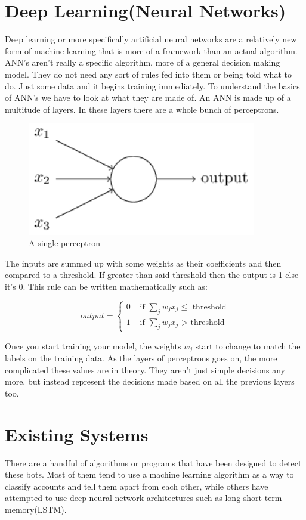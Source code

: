 \section{Deep Learning(Neural Networks)}
Deep learning or more specifically artificial neural networks are a relatively new form of machine learning that is more of a framework than an actual algorithm. ANN's aren't really a specific algorithm, more of a general decision making model. They do not need any sort of rules fed into them or being told what to do. Just some data and it begins training immediately. To understand the basics of ANN's we have to look at what they are made of. An ANN is made up of a multitude of layers. In these layers there are a whole bunch of perceptrons. 
\begin{figure}[!h]
\centering
\includegraphics[width=100mm]{figures/perceptron}
\caption{A single perceptron}
\end{figure}

The inputs are summed up with some weights as their coefficients and then compared to a threshold. If greater than said threshold then the output is 1 else it's 0. This rule can be written mathematically such as: 

$$
output = \begin{cases}
0 & \text{ if $\sum_{j}w_{j}x_{j} \leq$ threshold} \\
1 & \text{ if $\sum_{j}w_{j}x_{j}$ > threshold}
\end{cases}
$$

Once you start training your model, the weights $w_{j}$ start to change to match the labels on the training data. As the layers of perceptrons goes on, the more complicated these values are in theory. They aren't just simple decisions any more, but instead represent the decisions made based on all the previous layers too. 



\section{Existing Systems}
There are a handful of algorithms or programs that have been designed to detect these bots. Most of them tend to use a machine learning algorithm as a way to classify accounts and tell them apart from each other, while others have attempted to use deep neural network architectures such as long short-term memory(LSTM).  


